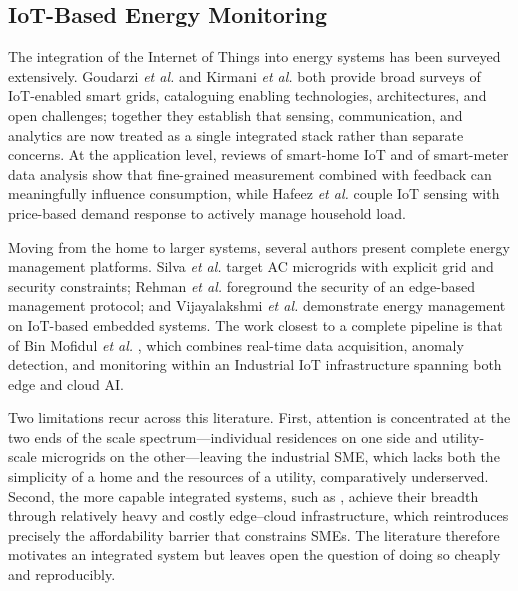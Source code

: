 \documentclass[conference]{IEEEtran}
\begin{document}
\subsection{IoT-Based Energy Monitoring}
The integration of the Internet of Things into energy systems has been surveyed
extensively. Goudarzi \textit{et al.} \cite{goudarzi2022survey} and Kirmani
\textit{et al.} \cite{kirmani2022survey} both provide broad surveys of
IoT-enabled smart grids, cataloguing enabling technologies, architectures, and
open challenges; together they establish that sensing, communication, and
analytics are now treated as a single integrated stack rather than separate
concerns. At the application level, reviews of smart-home IoT
\cite{alaa2017review} and of smart-meter data analysis \cite{yildiz2017recent}
show that fine-grained measurement combined with feedback can meaningfully
influence consumption, while Hafeez \textit{et al.} \cite{hafeez2020efficient}
couple IoT sensing with price-based demand response to actively manage household
load.
 
Moving from the home to larger systems, several authors present complete energy
management platforms. Silva \textit{et al.} \cite{silva2023iot} target AC
microgrids with explicit grid and security constraints; Rehman \textit{et al.}
\cite{rehman2022secure} foreground the security of an edge-based management
protocol; and Vijayalakshmi \textit{et al.} \cite{vijayalakshmi2023smart}
demonstrate energy management on IoT-based embedded systems. The work closest to
a complete pipeline is that of Bin Mofidul \textit{et al.} \cite{bin2022real},
which combines real-time data acquisition, anomaly detection, and monitoring
within an Industrial IoT infrastructure spanning both edge and cloud AI.
 
Two limitations recur across this literature. First, attention is concentrated
at the two ends of the scale spectrum---individual residences on one side and
utility-scale microgrids on the other---leaving the industrial SME, which lacks
both the simplicity of a home and the resources of a utility, comparatively
underserved. Second, the more capable integrated systems, such as
\cite{bin2022real}, achieve their breadth through relatively heavy and costly
edge--cloud infrastructure, which reintroduces precisely the affordability
barrier that constrains SMEs. The literature therefore motivates an integrated
system but leaves open the question of doing so cheaply and reproducibly.
 
\end{document}
